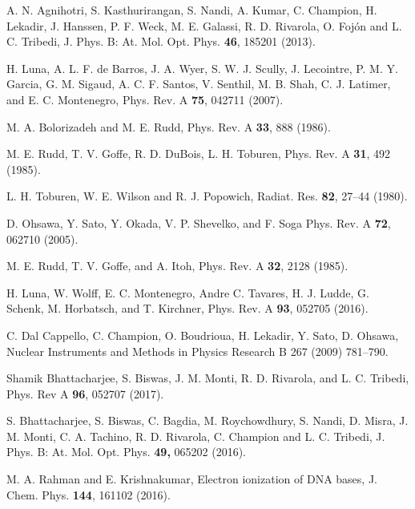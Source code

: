 \documentclass[10pt,showpacs,showkeys,twocolumn]{revtex4-1}
\begin{document}
\begin{thebibliography}{}
A. N. Agnihotri, S. Kasthurirangan, S. Nandi, A. Kumar, C. Champion, 
H. Lekadir, J. Hanssen, P. F. Weck, M. E. Galassi, R. D. Rivarola, 
O. Foj\'on and L. C. Tribedi, 
J. Phys. B: At. Mol. Opt. Phys. \textbf{46}, 185201 (2013).

H. Luna, A. L. F. de Barros, J. A. Wyer, S. W. J. Scully, J. Lecointre, 
P. M. Y. Garcia, G. M. Sigaud, A. C. F. Santos, V. Senthil, M. B. Shah, 
C. J. Latimer, and E. C. Montenegro,
Phys. Rev. A \textbf{75}, 042711 (2007).

M. A. Bolorizadeh and M. E. Rudd, 
Phys. Rev. A \textbf{33}, 888 (1986). 

M. E. Rudd, T. V. Goffe, R. D. DuBois, L. H. Toburen, 
Phys. Rev. A \textbf{31}, 492 (1985). 

L. H. Toburen, W. E. Wilson and R. J. Popowich,
Radiat. Res. \textbf{82}, 27--44 (1980).

D. Ohsawa, Y. Sato, Y. Okada, V. P. Shevelko, and F. Soga
Phys. Rev. A \textbf{72}, 062710 (2005).

M. E. Rudd, T. V. Goffe, and A. Itoh, 
Phys. Rev. A \textbf{32}, 2128 (1985).


H. Luna, W. Wolff, E. C. Montenegro, Andre C. Tavares, H. J. Ludde, 
G. Schenk, M. Horbatsch, and T. Kirchner, 
Phys. Rev. A \textbf{93}, 052705 (2016).  

C. Dal Cappello, C. Champion, O. Boudrioua, H. Lekadir, Y. Sato, 
D. Ohsawa, 
Nuclear Instruments and Methods in Physics Research B 267 (2009) 781--790.

Shamik Bhattacharjee, S. Biswas, J. M. Monti, R. D. Rivarola, and 
L. C. Tribedi,
Phys. Rev A \textbf{96}, 052707 (2017).

S. Bhattacharjee, S. Biswas, C. Bagdia, M. Roychowdhury, S. Nandi, 
D. Misra, J. M. Monti, C. A. Tachino, R. D. Rivarola, C. Champion and 
L. C. Tribedi, J. 
Phys. B: At. Mol. Opt. Phys. \textbf{49,}  065202 (2016).

M. A. Rahman and E. Krishnakumar,
Electron ionization of DNA bases,
J. Chem. Phys. \textbf{144}, 161102 (2016).



\end{thebibliography}
\end{document}
